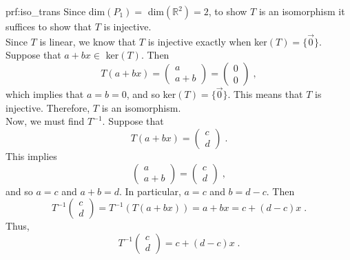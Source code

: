 \begin{prf}{prf:iso_trans} %
Since dim$(P_1) =$ dim$(\mathbb{R}^2) = 2$, to show $T$ is an isomorphism it suffices to show that $T$ is injective. \\

Since $T$ is linear, we know that $T$ is injective exactly when ker$(T) = \{ \vec{0} \}$. Suppose that $a + bx \in$ ker$(T)$. Then
$$T(a+bx)=\begin{pmatrix} a \\ a + b \end{pmatrix} = \begin{pmatrix} 0 \\ 0 \end{pmatrix}\;, $$
which implies that $a = b = 0$, and so ker$(T) = \{ \vec{0} \}.$ This means that $T$ is injective. Therefore, $T$ is an isomorphism. \\

\noindent Now, we must find $T^{-1}.$
Suppose that
$$T(a + bx) = \begin{pmatrix} c \\ d \end{pmatrix}\;.$$
This implies
$$\begin{pmatrix} a \\ a + b \end{pmatrix} = \begin{pmatrix} c \\ d \end{pmatrix}\;, $$
and so $a=c$ and $a + b = d.$ In particular, $a = c$ and $b = d-c.$ Then
$$T^{-1} \begin{pmatrix} c \\ d \end{pmatrix} = T^{-1}(T(a+bx))=a+bx=c+(d-c)x\;.$$
Thus,
$$T^{-1} \begin{pmatrix} c \\ d \end{pmatrix} = c+(d-c)x\;.$$
\end{prf}
